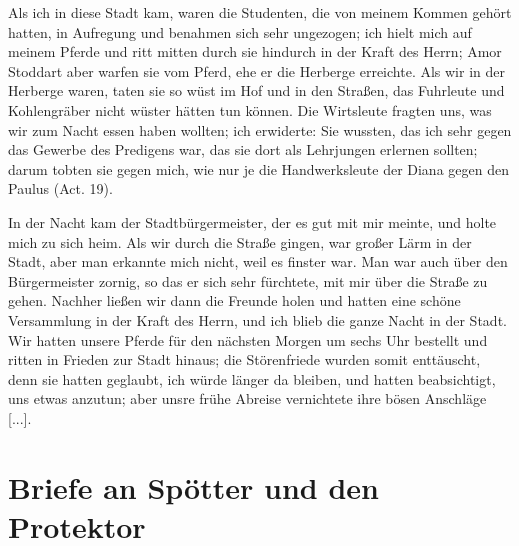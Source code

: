 Als ich in diese Stadt kam, waren die 
Studenten, die von
meinem Kommen gehört hatten, in Aufregung und benahmen
sich sehr ungezogen; ich hielt mich auf meinem Pferde und ritt
mitten durch sie hindurch in der Kraft des Herrn; 
Amor Stoddart
aber warfen sie vom Pferd, ehe er die Herberge erreichte. Als
wir in der Herberge waren, taten sie so wüst im Hof und in den
Straßen, das Fuhrleute und Kohlengräber nicht wüster hätten
tun können. Die Wirtsleute fragten uns, was wir zum Nacht
essen haben wollten; ich erwiderte:  Sie
wussten, das ich sehr gegen das Gewerbe des 
Predigens war, das
sie dort als Lehrjungen erlernen sollten; darum tobten sie gegen
mich, wie nur je die Handwerksleute der Diana gegen den Paulus
(Act. 19). 


In der Nacht kam der 
Stadtbürgermeister, der es gut mit mir meinte, und 
holte mich zu sich heim. Als wir durch
die Straße gingen, war großer Lärm in der Stadt, aber man
erkannte mich nicht, weil es finster war. Man war auch über
den Bürgermeister zornig, so das er sich sehr fürchtete, mit mir
über die Straße zu gehen. Nachher ließen wir dann die Freunde
holen und hatten eine schöne Versammlung in der Kraft des
Herrn, und ich blieb die ganze Nacht in der Stadt. Wir hatten
unsere Pferde für den nächsten Morgen um sechs Uhr bestellt
und ritten in Frieden zur Stadt hinaus; die Störenfriede wurden
somit enttäuscht, denn sie hatten geglaubt, ich würde länger da
bleiben, und hatten beabsichtigt, uns etwas anzutun; aber unsre
frühe Abreise vernichtete ihre bösen Anschläge [...].

\section{Briefe an Spötter und den Protektor}


